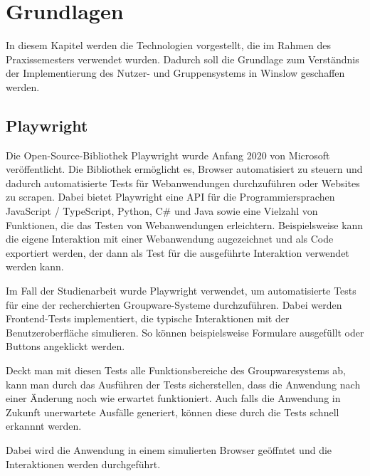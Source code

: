 \chapter{Grundlagen}

In diesem Kapitel werden die Technologien vorgestellt, die im Rahmen des Praxissemesters verwendet wurden.
Dadurch soll die Grundlage zum Verständnis der Implementierung des Nutzer- und Gruppensystems in Winslow geschaffen werden.

\section{Playwright}

Die Open-Source-Bibliothek Playwright wurde Anfang 2020 von Microsoft veröffentlicht.
Die Bibliothek ermöglicht es, Browser automatisiert zu steuern und dadurch automatisierte Tests für Webanwendungen durchzuführen oder Websites zu scrapen.
Dabei bietet Playwright eine API für die Programmiersprachen JavaScript / TypeScript, Python, C\# und Java sowie eine Vielzahl von Funktionen, die das Testen von Webanwendungen erleichtern.
Beispielsweise kann die eigene Interaktion mit einer Webanwendung augezeichnet und als Code exportiert werden, der dann als Test für die ausgeführte Interaktion verwendet werden kann.

Im Fall der Studienarbeit wurde Playwright verwendet, um automatisierte Tests für eine der recherchierten Groupware-Systeme durchzuführen.
Dabei werden Frontend-Tests implementiert, die typische Interaktionen mit der Benutzeroberfläche simulieren.
So können beispielsweise Formulare ausgefüllt oder Buttons angeklickt werden.

Deckt man mit diesen Tests alle Funktionsbereiche des Groupwaresystems ab, kann man durch das Ausführen der Tests sicherstellen, dass die Anwendung nach einer Änderung noch wie erwartet funktioniert.
Auch falls die Anwendung in Zukunft unerwartete Ausfälle generiert, können diese durch die Tests schnell erkannnt werden.





Dabei wird die Anwendung in einem simulierten Browser geöffntet und die Interaktionen werden durchgeführt.

\autocite[Quelle:][]{angular}






